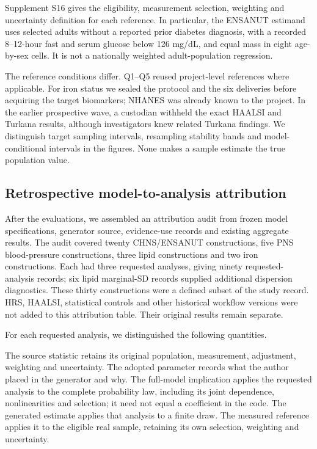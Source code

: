 \documentclass[11pt,letterpaper]{article}
\begin{document}
Supplement S16 gives the eligibility, measurement selection, weighting and uncertainty definition for each reference. In particular, the ENSANUT estimand uses selected adults without a reported prior diabetes diagnosis, with a recorded 8–\allowbreak{}12-hour fast and serum glucose below 126 mg/\allowbreak{}dL, and equal mass in eight age-by-sex cells. It is not a nationally weighted adult-population regression.


The reference conditions differ. Q1–\allowbreak{}Q5 reused project-level references where applicable. For iron status we sealed the protocol and the six deliveries before acquiring the target biomarkers; NHANES was already known to the project. In the earlier prospective wave, a custodian withheld the exact HAALSI and Turkana results, although investigators knew related Turkana findings. We distinguish target sampling intervals, resampling stability bands and model-conditional intervals in the figures. None makes a sample estimate the true population value.


\subsection{Retrospective model-to-analysis attribution}

After the evaluations, we assembled an attribution audit from frozen model specifications, generator source, evidence-use records and existing aggregate results. The audit covered twenty CHNS/\allowbreak{}ENSANUT constructions, five PNS blood-pressure constructions, three lipid constructions and two iron constructions. Each had three requested analyses, giving ninety requested-analysis records; six lipid marginal-SD records supplied additional dispersion diagnostics. These thirty constructions were a defined subset of the study record. HRS, HAALSI, statistical controls and other historical workflow versions were not added to this attribution table. Their original results remain separate.


For each requested analysis, we distinguished the following quantities.


The source statistic retains its original population, measurement, adjustment, weighting and uncertainty. The adopted parameter records what the author placed in the generator and why. The full-model implication applies the requested analysis to the complete probability law, including its joint dependence, nonlinearities and selection; it need not equal a coefficient in the code. The generated estimate applies that analysis to a finite draw. The measured reference applies it to the eligible real sample, retaining its own selection, weighting and uncertainty.
\end{document}
